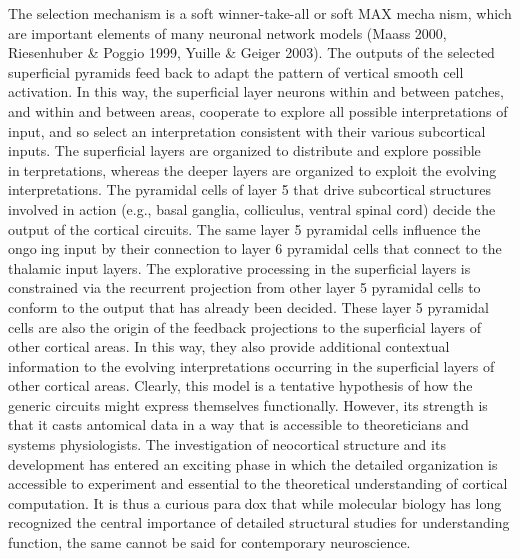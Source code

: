The selection mechanism is a soft winner-take-all or soft MAX mechanism, which are important elements of many neuronal network models (Maass
2000, Riesenhuber & Poggio 1999, Yuille & Geiger 2003). The outputs of the
selected superficial pyramids feed back to adapt the pattern of vertical smooth cell
activation. In this way, the superficial layer neurons within and between patches,
and within and between areas, cooperate to explore all possible interpretations
of input, and so select an interpretation consistent with their various subcortical
inputs.
The superficial layers are organized to distribute and explore possible interpretations, whereas the deeper layers are organized to exploit the evolving interpretations. The pyramidal cells of layer 5 that drive subcortical structures
involved in action (e.g., basal ganglia, colliculus, ventral spinal cord) decide the
output of the cortical circuits. The same layer 5 pyramidal cells influence the ongoing input by their connection to layer 6 pyramidal cells that connect to the thalamic
input layers. The explorative processing in the superficial layers is constrained via
the recurrent projection from other layer 5 pyramidal cells to conform to the output
that has already been decided. These layer 5 pyramidal cells are also the origin of
the feedback projections to the superficial layers of other cortical areas. In this way,
they also provide additional contextual information to the evolving interpretations
occurring in the superficial layers of other cortical areas.
Clearly, this model is a tentative hypothesis of how the generic circuits might
express themselves functionally. However, its strength is that it casts antomical
data in a way that is accessible to theoreticians and systems physiologists. The
investigation of neocortical structure and its development has entered an exciting
phase in which the detailed organization is accessible to experiment and essential
to the theoretical understanding of cortical computation. It is thus a curious paradox that while molecular biology has long recognized the central importance of
detailed structural studies for understanding function, the same cannot be said for
contemporary neuroscience.

